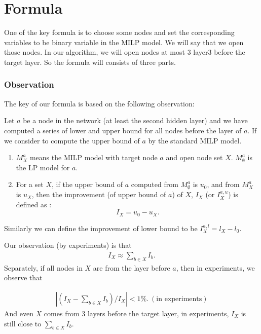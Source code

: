 \section*{Formula}

One of the key formula is to choose some nodes and set the corresponding variables to be binary variable in the MILP model. We will say that we open those nodes. In our algorithm, we will open nodes at most 3 layer3 before the target layer. So the formula will consists of three parts.

\subsubsection*{Observation}

The key of our formula is based on the following observation:

\begin{definition}[Improvement]
	
	Let $a$ be a node in the network (at least the second hidden layer) and we have computed a series of lower and upper bound for all nodes before the layer of $a$. If we consider to compute the upper bound of $a$ by the standard MILP model.
	
	\begin{enumerate}
		\item $M^a_X$ means the MILP model with target node $a$ and open node set $X$. $M^a_{\emptyset}$ is the LP model for $a$.
		
		\item For a set $X$, if the upper bound of $a$ computed from $M^a_{\emptyset}$ is $u_0$, and from $M^a_X$ is $u_X$, then the improvement (of upper bound of $a$) of $X$, $I_X$ (or $I_X^{a,u}$) is defined as : $$I_X = u_0-u_X.$$ 
	\end{enumerate}
\end{definition}

Similarly we can define the improvement of lower bound to be $I_X^{a,l} = l_X-l_0$.

Our observation (by experiments) is that \begin{align*}
	I_X \approx \sum_{b\in X} I_b.
\end{align*} Separately, if all nodes in $X$ are from the layer before $a$, then in experiments, we observe that 

\begin{align*}
	|(I_X - \sum_{b\in X} I_b)/I_X| < 1\%. \ (\text{in experiments})
\end{align*} And even $X$ comes from 3 layers before the target layer, in experiments, $I_X$ is still close to $\sum_{b\in X} I_b$.

